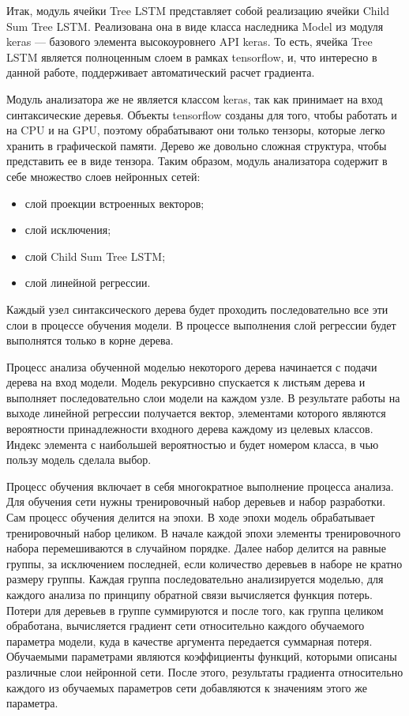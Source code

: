 Итак, модуль ячейки Tree LSTM представляет собой реализацию ячейки Child Sum Tree LSTM. Реализована она в виде класса наследника Model из модуля keras --- базового элемента высокоуровнего API keras. То есть, ячейка Tree LSTM является полноценным слоем в рамках tensorflow, и, что интересно в данной работе, поддерживает автоматический расчет градиента.

Модуль анализатора же не является классом keras, так как принимает на вход синтаксические деревья. Объекты tensorflow созданы для того, чтобы работать и на CPU и на GPU, поэтому обрабатывают они только тензоры, которые легко хранить в графической памяти. Дерево же довольно сложная структура, чтобы представить ее в виде тензора. Таким образом, модуль анализатора содержит в себе множество слоев нейронных сетей:

\begin{itemize}
\item слой проекции встроенных векторов;
\item слой исключения;
\item слой Child Sum Tree LSTM\@;
\item слой линейной регрессии.
\end{itemize}

Каждый узел синтаксического дерева будет проходить последовательно все эти слои в процессе обучения модели. В процессе выполнения слой регрессии будет выполнятся только в корне дерева.

Процесс анализа обученной моделью некоторого дерева начинается с подачи дерева на вход модели. Модель рекурсивно спускается к листьям дерева и выполняет последовательно слои модели на каждом узле. В результате работы на выходе линейной регрессии получается вектор, элементами которого являются вероятности принадлежности входного дерева каждому из целевых классов. Индекс элемента с наибольшей вероятностью и будет номером класса, в чью пользу модель сделала выбор.

Процесс обучения включает в себя многократное выполнение процесса анализа. Для обучения сети нужны тренировочный набор деревьев и набор разработки. Сам процесс обучения делится на эпохи. В ходе эпохи модель обрабатывает тренировочный набор целиком. В начале каждой эпохи элементы тренировочного набора перемешиваются в случайном порядке. Далее набор делится на равные группы, за исключением последней, если количество деревьев в наборе не кратно размеру группы. Каждая группа последовательно анализируется моделью, для каждого анализа по принципу обратной связи вычисляется функция потерь. Потери для деревьев в группе суммируются и после того, как группа целиком обработана, вычисляется градиент сети относительно каждого обучаемого параметра модели, куда в качестве аргумента передается суммарная потеря. Обучаемыми параметрами являются коэффициенты функций, которыми описаны различные слои нейронной сети. После этого, результаты градиента относительно каждого из обучаемых параметров сети добавляются к значениям этого же параметра.

